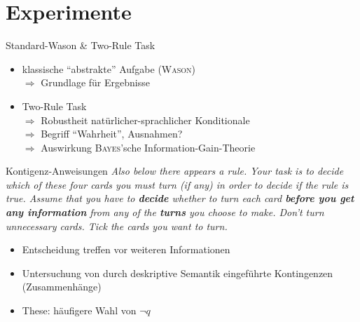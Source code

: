 
\section{Experimente}

\begin{frame}{Standard-Wason \& Two-Rule Task {\scriptsize \cite[S.~95-96]{stenningHumanReasoningCognitive2008}}}
    \begin{itemize}
        \item klassische \enquote{abstrakte} Aufgabe (\textsc{Wason}) \\
            $\Rightarrow$ Grundlage für Ergebnisse
        \pause

        \item Two-Rule Task \\
            $\Rightarrow$ Robustheit natürlicher-sprachlicher Konditionale \\
            $\Rightarrow$ Begriff \enquote{Wahrheit}, Ausnahmen? \\
            \pause
            $\Rightarrow$ Auswirkung \textsc{Bayes}'sche Information-Gain-Theorie
    \end{itemize}
\end{frame}


\begin{frame}{Kontigenz-Anweisungen {\scriptsize \cite[S.~96-97]{stenningHumanReasoningCognitive2008}}}
    \emph{
        {\small Also below there appears a rule.
        Your task is to decide which of these four cards you must turn (if any) in order to decide if the rule is true.}
        \alert{Assume that you have to \textbf{decide} whether to turn each card \textbf{before you get any information} from any of the \textbf{turns} you choose to make.}
        {\small Don't turn unnecessary cards. Tick the cards you want to turn.}
    }

    \begin{itemize}
        \item Entscheidung treffen vor weiteren Informationen
        \item Untersuchung von durch deskriptive Semantik eingeführte Kontingenzen {\footnotesize (Zusammenhänge)}
        \item These: häufigere Wahl von $\lnot q$
    \end{itemize}
\end{frame}


